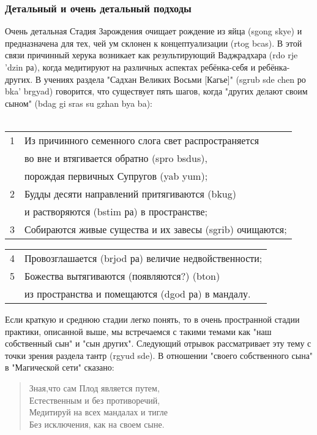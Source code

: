 \subsubsection{Детальный и очень детальный подходы}

Очень детальная Стадия Зарождения очищает рождение из яйца (sgong skye) и
предназначена для тех, чей ум склонен к концептуализации (rtog bcas). В этой связи
причинный херука возникает как результирующий Ваджрадхара (rdo rje 'dzin ра), когда
медитируют на различных аспектах ребёнка-себя и ребёнка-других. В учениях раздела
"Садхан Великих Восьми [Кагье]" (sgrub sde chen ро bka' brgyad) говорится, что существует
пять шагов, когда "других делают своим сыном" (bdag gi sras su gzhan bya ba):\\
\\
\begin{tabular}{ll}
1 & Из причинного семенного слога свет распространяется \\
  & во вне и втягивается обратно (spro bsdus), \\
  & порождая первичных Супругов (yab yum);\\
2 & Будды десяти направлений притягиваются (bkug) \\
  & и растворяются (bstim ра) в пространстве;\\
3 & Собираются живые существа и их завесы (sgrib) очищаются;\\
\end{tabular}

\begin{tabular}{ll}
4 & Провозглашается (brjod ра) величие недвойственности;\\
5 & Божества вытягиваются (появляются?) (bton) \\
  & из пространства и помещаются (dgod ра) в мандалу.\\
\end{tabular}

\begin{siderules}
Если краткую и среднюю стадии легко понять, то в очень пространной стадии практики,
описанной выше, мы встречаемся с такими темами как "наш собственный сын" и "сын
других". Следующий отрывок рассматривает эту тему с точки зрения раздела тантр
(rgyud sde). В отношении "своего собственного сына" в "Магической сети" сказано:

\begin{verse}
Зная,что сам Плод является путем,\\
Естественным и без противоречий,\\
Медитируй на всех мандалах и тигле\\
Без исключения, как на своем сыне.\\
\end{verse}

\end{siderules}

